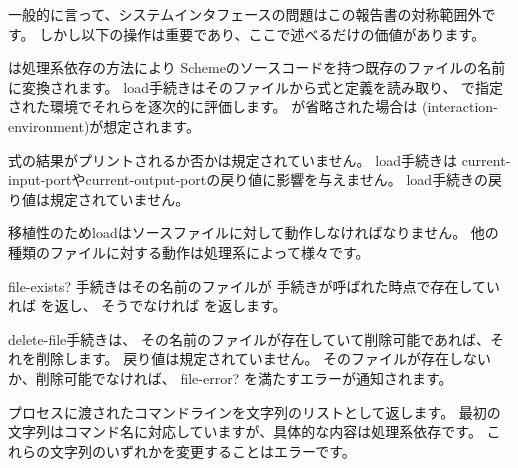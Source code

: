 一般的に言って、システムインタフェースの問題はこの報告書の対称範囲外です。
しかし以下の操作は重要であり、ここで述べるだけの価値があります。


\begin{entry}{%
}

は処理系依存の方法により
Schemeのソースコードを持つ既存のファイルの名前に変換されます。
{\cf load}手続きはそのファイルから式と定義を読み取り、
で指定された環境でそれらを逐次的に評価します。
が省略された場合は
{\cf (interaction-environment)}が想定されます。

式の結果がプリントされるか否かは規定されていません。
{\cf load}手続きは
{\cf current-\+input-\+port}や{\cf current-\+output-\+port}の戻り値に影響を与えません。
{\cf load}手続きの戻り値は規定されていません。


\begin{rationale}
移植性のため{\cf load}はソースファイルに対して動作しなければなりません。
他の種類のファイルに対する動作は処理系によって様々です。
\end{rationale}
\end{entry}

\begin{entry}{%
}

{\cf file-exists?} 手続きはその名前のファイルが
手続きが呼ばれた時点で存在していれば \schtrue{}を返し、
そうでなければ \schfalse{}を返します。

\end{entry}

\begin{entry}{%
}

{\cf delete-file}手続きは、
その名前のファイルが存在していて削除可能であれば、それを削除します。
戻り値は規定されていません。
そのファイルが存在しないか、削除可能でなければ、
{\cf file-error?} を満たすエラーが通知されます。

\end{entry}

\begin{entry}{%
}

プロセスに渡されたコマンドラインを文字列のリストとして返します。
最初の文字列はコマンド名に対応していますが、具体的な内容は処理系依存です。
これらの文字列のいずれかを変更することはエラーです。
\end{entry}

